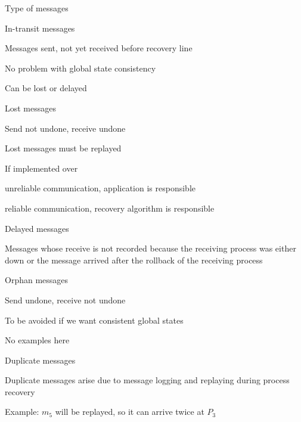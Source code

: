 \begin{frame}{Type of messages}

\begin{overprint}
\begin{block}{\alert{In-transit messages}}
\BI
\item Messages sent, not yet received before recovery line
\item No problem with global state consistency
\item Can be lost or delayed
\EI
\end{block}
\begin{block}{\alert{Lost messages}}
\BI
\item Send not undone, receive undone
\item Lost messages must be replayed
\item If implemented over
	\BI 
	\item unreliable communication, application is responsible
	\item reliable communication, recovery algorithm is responsible
	\EI
\EI
\end{block}
\begin{block}{\alert{Delayed messages}}
\BI
\item Messages whose receive is not recorded because the receiving process was
either down or the message arrived after the rollback of the receiving process
\EI
\end{block}
\begin{block}{\alert{Orphan messages}}
\BI
\item Send undone, receive not undone
\item To be avoided if we want consistent global states
\item No examples here
\EI
\end{block}
\begin{block}{\alert{Duplicate messages}}
\BI
\item Duplicate messages arise due to message logging and replaying during process recovery
\item Example: $m_5$ will be replayed, so it can arrive twice at $P_3$
\EI
\end{block}
\end{overprint}


\end{frame}
